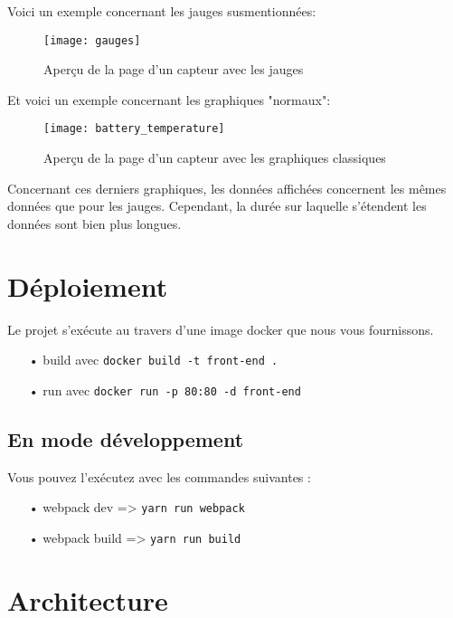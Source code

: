 Voici un exemple concernant les jauges susmentionnées:
\vspace{5mm}

\begin{figure}[h!]
\centering
\texttt{[image: gauges]}
\caption{Aperçu de la page d'un capteur avec les jauges}
\end{figure}

\clearpage
Et voici un exemple concernant les graphiques "normaux": 

\begin{figure}[h!]
\centering
\texttt{[image: battery\_temperature]}
\caption{Aperçu de la page d'un capteur avec les graphiques classiques}
\end{figure}
\vspace{3mm}

Concernant ces derniers graphiques, les données affichées concernent les mêmes données que pour les jauges. Cependant, la durée sur laquelle s'étendent les données sont bien plus longues.

\section{Déploiement}

Le projet s'exécute au travers d'une image docker que nous vous fournissons.

\begin{itemize}
\item[•] build avec \texttt{docker build -t front-end .}
\item[•] run avec \texttt{docker run -p 80:80 -d front-end}
\end{itemize}

\subsection{En mode développement}

Vous pouvez l'exécutez avec les commandes suivantes :

\begin{itemize}
\item[•] webpack dev => \texttt{yarn run webpack}
\item[•] webpack build => \texttt{yarn run build}
\end{itemize}

\section{Architecture}

